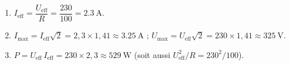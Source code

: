\documentclass[11pt,a4paper]{article}
\begin{document}
\begin{corrige}
\begin{enumerate}[label=\alph*)]
  \item $I_{\text{eff}}=\dfrac{U_{\text{eff}}}{R}=\dfrac{230}{100}=\qty{2.3}{\ampere}$.
  \item $I_{\max}=I_{\text{eff}}\sqrt2=2{,}3\times1{,}41\approx\qty{3.25}{\ampere}$ ; \quad
        $U_{\max}=U_{\text{eff}}\sqrt2=230\times1{,}41\approx\qty{325}{\volt}$.
  \item $P=U_{\text{eff}}\,I_{\text{eff}}=230\times2{,}3\approx\qty{529}{\watt}$
        (soit aussi $U_{\text{eff}}^2/R=230^2/100$).
\end{enumerate}
\end{corrige}
\end{document}
